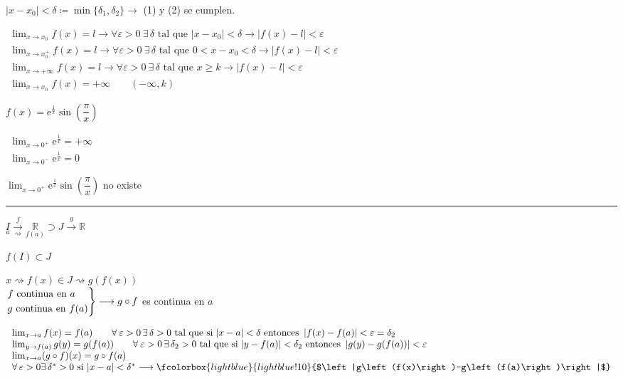 \documentclass[12pt]{article}
\newcommand{\bboxed}[1]{\fcolorbox{lightblue}{lightblue!10}{$#1$}}
\begin{document}
$|x-x_0|<\delta\coloneq\min\{\delta_1,\delta_2\}\longrightarrow$ (1) y (2) se cumplen.

$\begin{array}{l}
	\lim_{x\to x_0}f(x)=l\rightarrow\forall\varepsilon>0\:\exists\,\delta\text{ tal que }|x-x_0|<\delta\longrightarrow|f(x)-l|<\varepsilon\\
	\lim_{x\to x_0^+}f(x)=l\rightarrow\forall\varepsilon>0\:\exists\,\delta\text{ tal que }0<x-x_0<\delta\longrightarrow|f(x)-l|<\varepsilon\\
	\lim_{x\to +\infty}f(x)=l\rightarrow\forall\varepsilon>0\:\exists\,\delta\text{ tal que }x\ge k\longrightarrow|f(x)-l|<\varepsilon\\
	\lim_{x\to x_0}f(x)=+\infty\qquad(-\infty, k)
\end{array}$

$f(x)=\mathrm{e}^{\frac{1}{x}}\sin\left(\dfrac{\pi}{x}\right)$

\qquad$\begin{array}{l}
\lim_{x\to0^+}\mathrm{e}^{\frac{1}{x}}=+\infty\\
\lim_{x\to0^-}\mathrm{e}^{\frac{1}{x}}=0
\end{array}$

$\lim_{x\to0^+}\mathrm{e}^{\frac{1}{x}}\sin\left(\dfrac{\pi}{x}\right)$ no existe

\hrule

$\underset{a}{I}\xrightarrow[\rightsquigarrow]{f}\underset{f(a)}{\mathbb{R}}\supset J\xrightarrow{g}\mathbb{R}$

$f(I)\subset J$

$x\rightsquigarrow\boxed{f(x)}\in J\rightsquigarrow g(f(x))$\\
$\begin{rcases}
	f\text{ continua en }a\\
	g\text{ continua en }f(a)
\end{rcases}\longrightarrow g\circ f$ es continua en $a$

$\begin{array}{l}
	\lim_{x\to a}f(x)=f(a)\qquad\forall\:\varepsilon>0\,\exists\,\delta>0\text{ tal que si }|x-a|<\delta\text{ entonces }\left|f(x)-f(a)\right|<\varepsilon=\delta_2\\
	\lim_{y\to f(a)}g(y)=g(f(a))\qquad\forall\:\varepsilon>0\,\exists\,\delta_2>0\text{ tal que si }|y-f(a)|<\delta_2\text{ entonces }\left|g(y)-g(f(a))\right|<\varepsilon\\
	\lim_{x\to a}(g\circ f)(x)=g\circ f(a)\\
	\forall\,\varepsilon>0\exists\,\delta^*>0\text{ si }|x-a|<\delta^*\longrightarrow\bboxed{\left|g\left(f(x)\right)-g\left(f(a)\right)\right|}
\end{array}$
\end{document}
